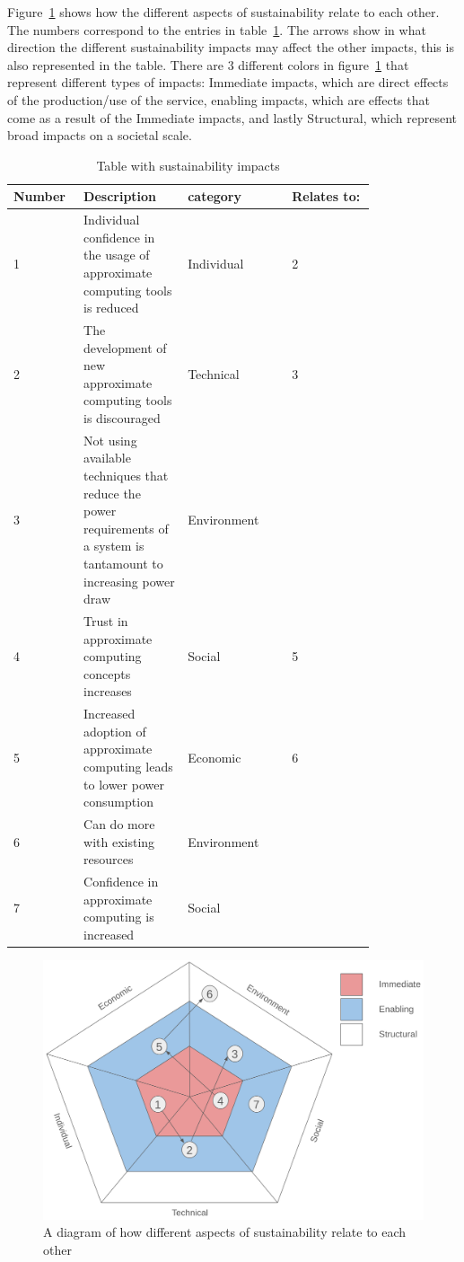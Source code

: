 Figure~\ref{fig:SusAF_diagram} shows how the different aspects of sustainability relate to each other. The numbers correspond to the entries in table~\ref{table:SusAF_table}. The arrows show in what direction the different sustainability impacts may affect the other impacts, this is also represented in the table.
There are 3 different colors in figure~\ref{fig:SusAF_diagram} that represent different types of impacts: Immediate impacts, which are direct effects of the production/use of the service, enabling impacts, which are effects that come as a result of the Immediate impacts, and lastly Structural, which represent broad impacts on a societal scale.

\begin{table}[htb]
    \centering
    \caption{Table with sustainability impacts}
    \label{table:SusAF_table}
    \begin{tabular}{p{0.1\linewidth}|p{0.25\linewidth}|p{0.25\linewidth}|p{0.2\linewidth}} 
        Number & Description & category & Relates to: \\
        \hline
         1 & Individual confidence in the usage of approximate computing tools is reduced & Individual & 2 \\
         2 & The development of new approximate computing tools is discouraged & Technical & 3\\
         3 & Not using available techniques that reduce the power requirements of a system is tantamount to increasing power draw & Environment & \\
         4 & Trust in approximate computing concepts increases & Social &  5 \\
         5 & Increased adoption of approximate computing leads to lower power consumption & Economic &6 \\    
         6 & Can do more with existing resources & Environment & \\
         7 & Confidence in approximate computing is increased& Social&  \\
    \end{tabular}
    
\end{table}


\begin{figure}[h]
    \centering
    \includegraphics[width=0.75\linewidth]{Images/SusAF_diagram.png}
    \caption{A diagram of how different aspects of sustainability relate to each other}
    \label{fig:SusAF_diagram}
\end{figure}
